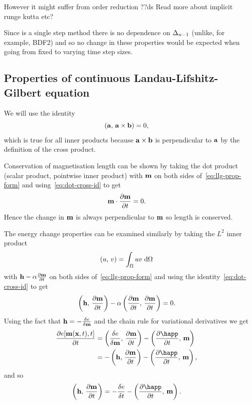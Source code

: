 However it might suffer from order reduction ??ds Read more about implicit runge kutta etc?

Since \imr is a single step method there is no dependence on $\Delta_{n-1}$ (unlike, for example, BDF2) and so no change in these properties would be expected when going from fixed to varying time step sizes.

\subsection{Properties of continuous Landau-Lifshitz-Gilbert equation}
\label{sec:prop-cont-llg}

We will use the identity
\begin{equation}
  \label{eq:dot-cross-id}
  \left({\mathbf{a}},\, {\mathbf{a}} \times {\mathbf{b}} \right) = 0,
\end{equation}
which is true for all inner products because ${\mathbf{a}} \times {\mathbf{b}}$ is perpendicular to ${\mathbf{a}}$ by the definition of the cross product.

Conservation of magnetisation length can be shown by taking the dot product (scalar product, pointwise inner product) with $\mathbf{m}$ on both sides of~\eqref{eq:llg-prop-form} and using~\eqref{eq:dot-cross-id} to get
\begin{equation}
  \label{eq:56}
  \mathbf{m} \cdot \frac{\partial \mathbf{m}}{\partial t} = 0.
\end{equation}
Hence the change in $\mathbf{m}$ is always perpendicular to $\mathbf{m}$ so length is conserved.

The energy change properties can be examined similarly by taking the $L^2$ inner product
\begin{equation}
  \left(u,\, v \right) = \int_\Omega u v {\; \text{d}}\Omega
\end{equation}
with $\mathbf{h} - \alpha \frac{\partial \mathbf{m}}{\partial t}$ on both sides of~\eqref{eq:llg-prop-form} and using the identity~\eqref{eq:dot-cross-id} to get
\begin{equation}
  \label{eq:58}
  \left(\mathbf{h},\, \frac{\partial \mathbf{m}}{\partial t} \right) - \alpha \left(\frac{\partial \mathbf{m}}{\partial t},\, \frac{\partial \mathbf{m}}{\partial t} \right) = 0.
\end{equation}
Using the fact that $\mathbf{h} = -\frac{\delta e}{\delta \mathbf{m}}$ and the chain rule for variational derivatives\cite{??ds} we get
\begin{align*}
  \pd{\e[\mv(\xv, t), t]}{t} &= \ip{\vd{e}{\mv}}{\dmdt} - \ip{\pd{\happ}{t}}{\mv} \\
             &= -\ip{\hv}{\dmdt} - \ip{\pd{\happ}{t}}{\mv},
\end{align*}
and so
\begin{equation}
  \ip{\hv}{\dmdt} = -\vd{\e}{t} - \ip{\pd{\happ}{t}}{\mv}.
\end{equation}

